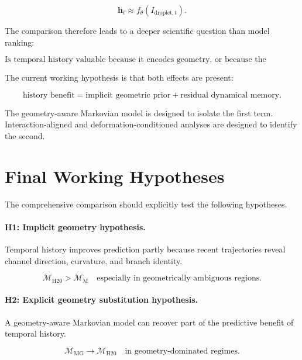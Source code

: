 \documentclass[11pt]{article}
\newcommand{\Mhist}{\mathcal{M}_{\mathrm{H20}}}
\newcommand{\Mmark}{\mathcal{M}_{\mathrm{M}}}
\newcommand{\Mgeom}{\mathcal{M}_{\mathrm{MG}}}
\begin{document}
\begin{equation}
\mathbf{h}_t
\approx
f_{\theta}
\left(
I_{\mathrm{droplet},t}
\right).
\end{equation}

The comparison therefore leads to a deeper scientific question than model ranking:

\begin{equation}
\boxed{
\text{Is temporal history valuable because it encodes geometry, or because the measured instantaneous state is not physically complete?}
}
\end{equation}

The current working hypothesis is that both effects are present:

\begin{equation}
\boxed{
\text{history benefit}
=
\text{implicit geometric prior}
+
\text{residual dynamical memory}.
}
\end{equation}

The geometry-aware Markovian model is designed to isolate the first term. Interaction-aligned and deformation-conditioned analyses are designed to identify the second.

\section{Final Working Hypotheses}

The comprehensive comparison should explicitly test the following hypotheses.

\paragraph{H1: Implicit geometry hypothesis.}
Temporal history improves prediction partly because recent trajectories reveal channel direction, curvature, and branch identity.

\begin{equation}
\Mhist > \Mmark
\quad
\text{especially in geometrically ambiguous regions}.
\end{equation}

\paragraph{H2: Explicit geometry substitution hypothesis.}
A geometry-aware Markovian model can recover part of the predictive benefit of temporal history.

\begin{equation}
\Mgeom \rightarrow \Mhist
\quad
\text{in geometry-dominated regimes}.
\end{equation}
\end{document}
